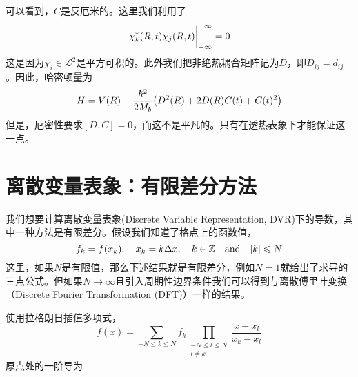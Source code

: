 \documentclass[UTF8,12pt]{article}
\begin{document}
        可以看到，$C$是反厄米的。这里我们利用了
        \begin{equation}
            \eval{\chi_k^*(R,t)\chi_j(R,t)}_{-\infty}^{+\infty}=0
        \end{equation}
        这是因为$\chi_i\in\mathcal{L}^2$是平方可积的。此外我们把非绝热耦合矩阵记为$D$，即$D_{ij}=d_{ij}$。因此，哈密顿量为
        \begin{align}
            H=V(R)-\frac{\hbar^2}{2M_b}\qty(D^2(R)+2D(R)C(t)+C(t)^2)
        \end{align}
        但是，厄密性要求$[D,C]=0$，而这不是平凡的。只有在透热表象下才能保证这一点。

    \section{离散变量表象：有限差分方法}
        我们想要计算离散变量表象(Discrete Variable Representation, DVR)下的导数，其中一种方法是有限差分。假设我们知道了格点上的函数值，
        \begin{equation}
            f_k=f(x_k)\qc x_k=k\Delta x\qc k\in\mathbb{Z}\qand\abs{k}\leqslant N
        \end{equation}
        这里，如果$N$是有限值，那么下述结果就是有限差分，例如$N=1$就给出了求导的三点公式。但如果$N\rightarrow\infty$且引入周期性边界条件我们可以得到与离散傅里叶变换（Discrete Fourier Transformation (DFT)）一样的结果。\par
        使用拉格朗日插值多项式，
        \begin{equation}
            f(x)=\sum_{-N\leqslant k\leqslant N}{f_k\prod_{\substack{-N\leqslant l\leqslant N\\l\neq k}}{\frac{x-x_l}{x_k-x_l}}}
        \end{equation}
        原点处的一阶导为
\end{document}
